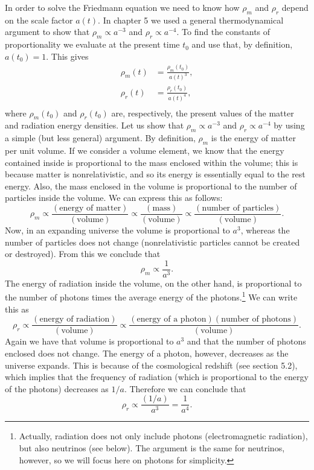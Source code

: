 In order to solve the Friedmann equation we need to know how $\rho_m$ and $\rho_r$ depend on the scale factor $a(t)$. In chapter 5 we used a general thermodynamical argument to show that $\rho_m\propto a^{-3}$ and $\rho_r\propto a^{-4}$. To find the constants of proportionality we evaluate at the present time $t_0$ and use that, by definition, $a(t_0)=1$. This gives
\begin{equation}
\begin{split}
\rho_m(t)&= \frac{\rho_m(t_0)}{a(t)^3},\\
\rho_r(t)&= \frac{\rho_r(t_0)}{a(t)^4},\\
\end{split}
\end{equation}
where $\rho_m(t_0)$ and $\rho_r(t_0)$ are, respectively, the present values of the matter and radiation energy densities. Let us show that $\rho_m\propto a^{-3}$ and $\rho_r\propto a^{-4}$ by using a simple (but less general) argument. By definition, $\rho_m$ is the energy of matter per unit volume. If we consider a volume element, we know that the energy contained inside is proportional to the mass enclosed within the volume; this is because matter is nonrelativistic, and so its energy is essentially equal to the rest energy. Also, the mass enclosed in the volume is proportional to the number of particles inside the volume. We can express this as follows:
\begin{equation}
\rho_m\propto \frac{(\mbox{energy of matter})}{(\mbox{volume})}\propto \frac{(\mbox{mass})}{(\mbox{volume})}\propto \frac{(\mbox{number of particles})}{(\mbox{volume})}.
\end{equation}
Now, in an expanding universe the volume is proportional to $a^3$, whereas the number of particles does not change (nonrelativistic particles cannot be created or destroyed). From this we conclude that
\begin{equation}
\rho_m\propto \frac{1}{a^3}.
\end{equation}
The energy of radiation inside the volume, on the other hand, is proportional to the number of photons times the average energy of the photons.\footnote{Actually, radiation does not only include photons (electromagnetic radiation), but also neutrinos (see below). The argument is the same for neutrinos, however, so we will focus here on photons for simplicity.} We can write this as
\begin{equation}
\rho_r\propto \frac{(\mbox{energy of radiation})}{(\mbox{volume})}\propto \frac{(\mbox{energy of a photon})(\mbox{number of photons})}{(\mbox{volume})}.
\end{equation}
Again we have that volume is proportional to $a^3$ and that the number of photons enclosed does not change. The energy of a photon, however, decreases as the universe expands. This is because of the cosmological redshift (see section 5.2), which implies that the frequency of radiation (which is proportional to the energy of the photons) decreases as $1/a$. Therefore we can conclude that
\begin{equation}
\rho_r\propto \frac{(1/a)}{a^3}=\frac{1}{a^4}.
\end{equation}

